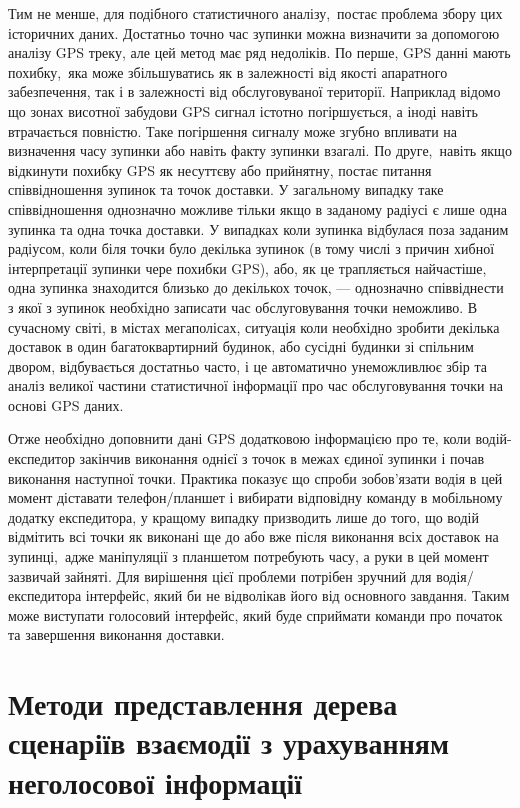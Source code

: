 Тим не менше, для подібного статистичного аналізу, постає проблема збору цих історичних даних. Достатньо точно час зупинки можна визначити за допомогою аналізу GPS треку, але цей метод має ряд недоліків. По перше, GPS данні мають похибку, яка може збільшуватись як в залежності від якості апаратного забезпечення, так і в залежності від обслуговуваної території. Наприклад відомо що зонах висотної забудови GPS сигнал істотно погіршується, а іноді навіть втрачається повністю. Таке погіршення сигналу може згубно впливати на визначення часу зупинки або навіть факту зупинки взагалі. По друге, навіть якщо відкинути похибку GPS як несуттєву або прийнятну, постає питання співвідношення зупинок та точок доставки. У загальному випадку таке співвідношення однозначно можливе тільки якщо в заданому радіусі є лише одна зупинка та одна точка доставки. У випадках коли зупинка відбулася поза заданим радіусом, коли біля точки було декілька зупинок (в тому числі з причин хибної інтерпретації зупинки чере похибки GPS), або, як це трапляється найчастіше, одна зупинка знаходится близько до декількох точок, --- однозначно співвіднести з якої з зупинок необхідно записати час обслуговування точки неможливо. В сучасному світі, в містах мегаполісах, ситуація коли необхідно зробити декілька доставок в один багатоквартирний будинок, або сусідні будинки зі спільним двором, відбувається достатньо часто, і це автоматично унеможливлює збір та аналіз великої частини статистичної інформації про час обслуговування точки на основі GPS даних.

Отже необхідно доповнити дані GPS додатковою інформацією про те, коли водій-експедитор закінчив виконання однієї з точок в межах єдиної зупинки і почав виконання наступної точки. Практика показує що спроби зобов'язати водія в цей момент діставати телефон/планшет і вибирати відповідну команду в мобільному додатку експедитора, у кращому випадку призводить лише до того, що водій відмітить всі точки як виконані ще до або вже після виконання всіх доставок на зупинці, адже маніпуляції з планшетом потребують часу, а руки в цей момент зазвичай зайняті. Для вирішення цієї проблеми потрібен зручний для водія/експедитора інтерфейс, який би не відволікав його від основного завдання. Таким може виступати голосовий інтерфейс, який буде сприймати команди про початок та завершення виконання доставки.


\section{Методи представлення дерева сценаріїв взаємодії з урахуванням неголосової інформації} \label{sect2_3}

